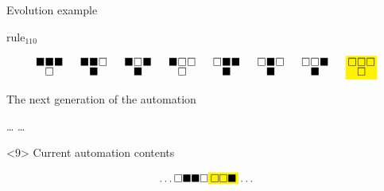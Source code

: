 \documentclass[presentation,aspectratio=169,smaller]{beamer}
\begin{document}
\begin{frame}[label={sec:org812e2ea},t]{Evolution example}
\begin{onlyenv}
\(\text{rule}_{110}\)

\begin{equation*}
  \begingroup
  \setlength\arraycolsep{0.25pt}
  \renewcommand{\arraystretch}{0.5}
  \begin{matrix}
    \blacksquare & \blacksquare & \blacksquare \\
    & \square &
  \end{matrix}\mspace{28mu}
  \begin{matrix}
    \blacksquare & \blacksquare & \square \\
    & \blacksquare &
  \end{matrix}\mspace{28mu}
  \begin{matrix}
    \blacksquare & \square & \blacksquare \\
    & \blacksquare &
  \end{matrix}\mspace{28mu}
  \begin{matrix}
    \blacksquare & \square & \square \\
    & \square &
  \end{matrix}\mspace{28mu}
  \begin{matrix}
    \square & \blacksquare & \blacksquare \\
    & \blacksquare &
  \end{matrix}\mspace{28mu}
  \begin{matrix}
    \square & \blacksquare & \square \\
    & \blacksquare &
  \end{matrix}\mspace{28mu}
  \begin{matrix}
    \square & \square & \blacksquare \\
    & \blacksquare &
  \end{matrix}\mspace{28mu}
  \mathcolorbox{yellow}{
    \begin{matrix}
      \square & \square & \square \\
      & \square &
    \end{matrix}
  }
  \endgroup
\end{equation*}

The next generation of the automation

\hfill \dots
\blacksquare
\blacksquare
\blacksquare
\square
{}
\mspace{14mu}
\mspace{14mu}
\dots \hfill
\end{onlyenv}

\begin{onlyenv}<9>
Current automation contents

\begin{equation*}
  \hfill
  \dots
  \square
  \blacksquare
  \blacksquare
  \square
  \mathcolorbox{yellow}{
    \square
    \square
    \blacksquare
  }
  \dots
  \hfill
\end{equation*}


\end{onlyenv}
\end{frame}
\end{document}
